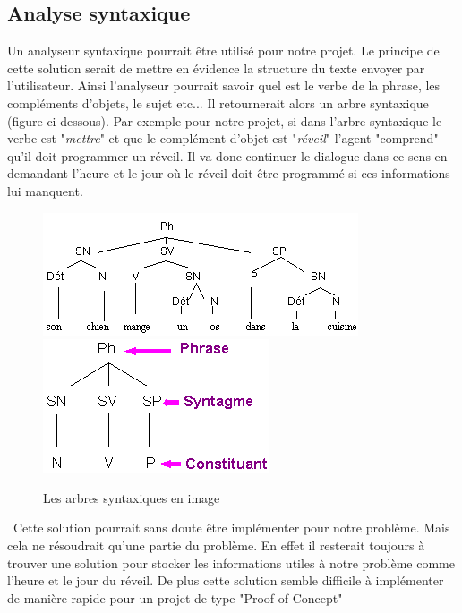 \subsection{Analyse syntaxique}
Un analyseur syntaxique pourrait être utilisé pour notre projet. Le principe de cette solution serait de mettre en évidence la structure du texte envoyer par l'utilisateur. Ainsi l'analyseur pourrait savoir quel est le verbe de la phrase, les compléments d'objets, le sujet etc... Il retournerait alors un arbre syntaxique (figure ci-dessous). Par exemple pour notre projet, si dans l'arbre syntaxique le verbe est "\textit{mettre}" et que le complément d'objet est "\textit{réveil}" l'agent "comprend" qu'il doit programmer un réveil. Il va donc continuer le dialogue dans ce sens en demandant l'heure et le jour où le réveil doit être programmé si ces informations lui manquent.
\begin{figure}[H]
 \includegraphics[scale=0.5]{images/arbre.png}
 \includegraphics[scale=0.5]{images/arbre2.png}
 \caption{Les arbres syntaxiques en image}
\end{figure}\
Cette solution pourrait sans doute être implémenter pour notre problème. Mais cela ne résoudrait qu'une partie du problème. En effet il resterait toujours à trouver une solution pour stocker les informations utiles à notre problème comme l'heure et le jour du réveil. De plus cette solution semble difficile à implémenter de manière rapide pour un projet de type "Proof of Concept"  


